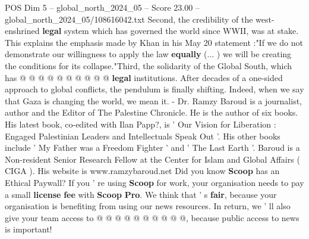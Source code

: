 \begin{textsample}{POS Dim 5 – global\_north\_2024\_05 – Score 23.00 – global\_north\_2024\_05/108616042.txt}
Second, the credibility of the west-enshrined \textbf{legal} system which has governed the world since WWII, was at stake.
This explains the emphasis made by Khan in his May 20 statement :"If we do not demonstrate our willingness to apply the law \textbf{equally} (... ) we will be creating the conditions for its collapse."Third, the solidarity of the Global South, which has @ @ @ @ @ @ @ @ @ @ \textbf{legal} institutions.
After decades of a one-sided approach to global conflicts, the pendulum is finally shifting.
Indeed, when we say that Gaza is changing the world, we mean it. - Dr.
Ramzy Baroud is a journalist, author and the Editor of The Palestine Chronicle.
He is the author of six books.
His latest book, co-edited with Ilan Papp?, is ' Our Vision for Liberation : Engaged Palestinian Leaders and Intellectuals Speak Out '.
His other books include ' My Father was a Freedom Fighter ' and ' The Last Earth '.
Baroud is a Non-resident Senior Research Fellow at the Center for Islam and Global Affairs ( CIGA ).
His website is www.ramzybaroud.net Did you know \textbf{Scoop} has an Ethical Paywall?
If you ' re using \textbf{Scoop} for work, your organisation needs to pay a small \textbf{license} \textbf{fee} with \textbf{Scoop} \textbf{Pro}.
We think that ' s \textbf{fair}, because your organisation is benefiting from using our news resources.
In return, we ' ll also give your team access to @ @ @ @ @ @ @ @ @ @, because public access to news is important!

\end{textsample}
